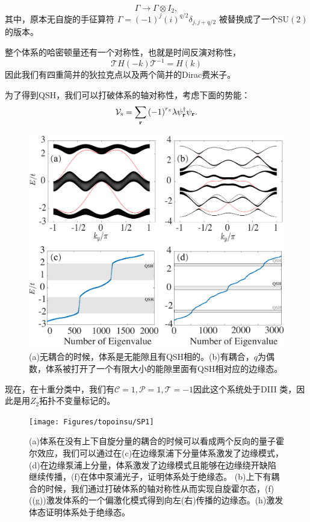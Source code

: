 \documentclass[supercite]{HustGraduPaper}
\begin{document}
\begin{equation}
\Gamma \rightarrow \Gamma \otimes I_2,
\end{equation}
其中，原本无自旋的手征算符 $\Gamma = (-1)^j (i)^{q/2} \delta_{j,j+q/2}$ 被替换成了一个SU$(2)$的版本。

整个体系的哈密顿量还有一个对称性，也就是时间反演对称性，
\begin{equation}
\mathcal{T} H(-k) \mathcal{T}^{-1} = H(k)
\end{equation}
因此我们有四重简并的狄拉克点以及两个简并的Dirac费米子。

为了得到QSH，我们可以打破体系的轴对称性，考虑下面的势能：
	\begin{equation}
\label{Eq:Potential}
\mathcal{V}_{\text{s}} = \sum_{\bf r} {\left( {-1} \right)^{r_x}}{\lambda}\psi _{{\bf r}}^\dag {\psi _{{\bf r}}}.
\end{equation}
\begin{figure}
	\centering
	\includegraphics[width=1\linewidth]{Figures/topoinsu/fig3}
	\caption{(a)无耦合的时候，体系是无能隙且有QSH相的。(b)有耦合，$q$为偶数，体系被打开了一个有限大小的能隙里面有QSH相对应的边缘态。}
	\label{fig:fig3}
\end{figure}
现在，在十重分类中，我们有$\mathcal{C} = 1 , \mathcal{P} = 1, \mathcal{T}  = -1$因此这个系统处于DIII 类，因此是用$Z_2$拓扑不变量标记的。
\begin{figure}
	\centering
	\texttt{[image: Figures/topoinsu/SP1]}
	\caption{(a)体系在没有上下自旋分量的耦合的时候可以看成两个反向的量子霍尔效应，我们可以通过在(c)在边缘泵浦下分量体系激发了边缘模式，(d)在边缘泵浦上分量，体系激发了边缘模式且能够在边缘绕开缺陷继续传播，(f)在体中泵浦光子，证明体系处于绝缘态。 (b)上下有耦合的时候，我们通过打破体系的轴对称性从而实现自旋霍尔态，(f)((g))激发体系的一个偏激化模式得到向左(右)传播的边缘态。(h)激发体态证明体系处于绝缘态。}
	\label{fig:sp1}
\end{figure}
\end{document}
